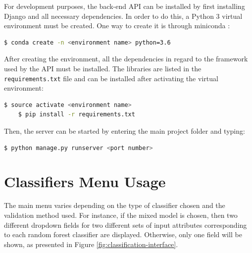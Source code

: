 \documentclass[bsc,frontabs,twoside,singlespacing, parskip,deptreport]{infthesis}     %
\begin{document}
\begin{appendices}
For development purposes, the back-end API can be installed by first installing Django and all necessary dependencies. In order to do this, a Python 3 virtual environment must be created. One way to create it is through miniconda \cite{miniconda}:

\begin{lstlisting}[language=bash, backgroundcolor=\color{lightgray!20}, basicstyle=\ttfamily\bfseries] 
	$ conda create -n <environment name> python=3.6
\end{lstlisting}

After creating the environment, all the dependencies in regard to the framework used by the API must be installed. The libraries are listed in the \texttt{requirements.txt} file and can be installed after activating the virtual environment:

\begin{lstlisting}[language=bash, backgroundcolor=\color{lightgray!20}, basicstyle=\ttfamily\bfseries] 
	$ source activate <environment name>
	$ pip install -r requirements.txt
\end{lstlisting}

Then, the server can be started by entering the main project folder and typing:

\begin{lstlisting}[language=bash, backgroundcolor=\color{lightgray!20}, basicstyle=\ttfamily\bfseries] 
	$ python manage.py runserver <port number>
\end{lstlisting}

\section{Classifiers Menu Usage}

The main menu varies depending on the type of classifier chosen and the validation method used. For instance, if the mixed model is chosen, then two different dropdown fields for two different sets of input attributes corresponding to each random forest classifier are displayed. Otherwise, only one field will be shown, as presented in Figure \ref{fig:classification-interface}.


\end{appendices}
\end{document}
